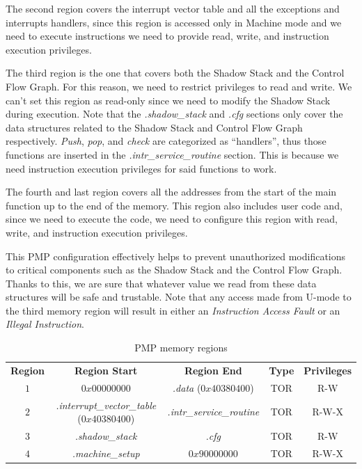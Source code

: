 The second region covers the interrupt vector table and all the exceptions and
interrupts handlers, since this region is accessed only in Machine mode and we need
to execute instructions we need to provide read, write, and instruction execution
privileges.

The third region is the one that covers both the Shadow Stack and the Control Flow
Graph. For this reason, we need to restrict privileges to read and write. We can't
set this region as read-only since we need to modify the Shadow Stack during
execution. Note that the \textit{.shadow\_stack} and \textit{.cfg} sections only
cover the data structures related to the Shadow Stack and Control Flow Graph respectively.
\textit{Push}, \textit{pop}, and \textit{check} are categorized as ``handlers'',
thus those functions are inserted in the \textit{.intr\_service\_routine} section.
This is because we need instruction execution privileges for said functions to
work.

The fourth and last region covers all the addresses from the start of the main
function up to the end of the memory. This region also includes user code and,
since we need to execute the code, we need to configure this region with read,
write, and instruction execution privileges.

This PMP configuration effectively helps to prevent unauthorized modifications to
critical components such as the Shadow Stack and the Control Flow Graph. Thanks
to this, we are sure that whatever value we read from these data structures will
be safe and trustable. Note that any access made from U-mode to the third memory
region will result in either an \textit{Instruction Access Fault} or an \textit{Illegal
Instruction}.

\begin{table}
  \centering
  \begin{tabular}{|c|c|c|c|c|}
    \hline
    \textbf{Region}    & \textbf{Region Start}                             & \textbf{Region End}              & \textbf{Type} & \textbf{Privileges} \\
    \hhline{=====} $1$ & $0x00000000$                                      & \textit{.data} ($0x40380400$)    & TOR           & R-W                 \\
    \hline
    $2$                & \textit{.interrupt\_vector\_table} ($0x40380400$) & \textit{.intr\_service\_routine} & TOR           & R-W-X               \\
    \hline
    $3$                & \textit{.shadow\_stack}                           & \textit{.cfg}                    & TOR           & R-W                 \\
    \hline
    $4$                & \textit{.machine\_setup}                          & $0x90000000$                     & TOR           & R-W-X               \\
    \hline
  \end{tabular}
  \caption{PMP memory regions}
  \label{tab:pmpregions}
\end{table}

